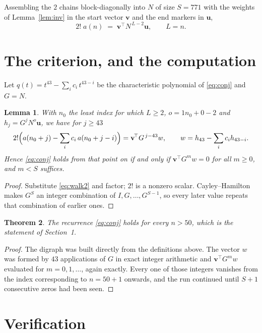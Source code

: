 \documentclass[11pt,a4paper]{article}
\theoremstyle{plain}
\newtheorem{theorem}{Theorem}
\newtheorem{lemma}[theorem]{Lemma}
\theoremstyle{definition}
\begin{document}
Assembling the $2$ chains block-diagonally into $N$ of size $S=771$ with the weights of
Lemma~\ref{lem:inv} in the start vector $\mathbf{v}$ and the end markers in
$\mathbf{u}$,
\begin{equation}\label{eq:walk2}
2!\;a(n)\;=\;\mathbf{v}^{\!\top}N^{\,L-2}\mathbf{u},\qquad L=n .
\end{equation}

\section{The criterion, and the computation}

Let $q(t)=t^{43}-\sum_i c_i\,t^{43-i}$ be the characteristic polynomial of
\eqref{eq:conj} and $G=N$.

\begin{lemma}\label{lem:crit}
With $n_0$ the least index for which $L\ge2$, $o=1n_0+0-2$ and
$h_j=G^{j}N^{o}\mathbf{u}$, we have for $j\ge43$
\[
2!\Bigl(a(n_0+j)-\sum_i c_i\,a(n_0+j-i)\Bigr)=\mathbf{v}^{\!\top}G^{\,j-43}w,
\qquad w=h_{43}-\sum_i c_i h_{43-i} .
\]
Hence \eqref{eq:conj} holds from that point on if and only if
$\mathbf{v}^{\!\top}G^{m}w=0$ for all $m\ge0$, and $m<S$ suffices.
\end{lemma}

\begin{proof}
Substitute \eqref{eq:walk2} and factor; $2!$ is a nonzero scalar. Cayley--Hamilton
makes $G^{S}$ an integer combination of $I,G,\dots,G^{S-1}$, so every later value repeats
that combination of earlier ones.
\end{proof}

\begin{theorem}
The recurrence \eqref{eq:conj} holds for every $n>50$, which is the statement of
Section~1.
\end{theorem}

\begin{proof}
The digraph was built directly from the definitions above. The vector $w$ was formed by
$43$ applications of $G$ in exact integer arithmetic and $\mathbf{v}^{\!\top}G^{m}w$
evaluated for $m=0,1,\dots$, again exactly. Every one of those integers vanishes from the
index corresponding to $n=50+1$ onwards, and the run continued until $S+1$ consecutive
zeros had been seen.
\end{proof}

\section{Verification}
\end{document}
